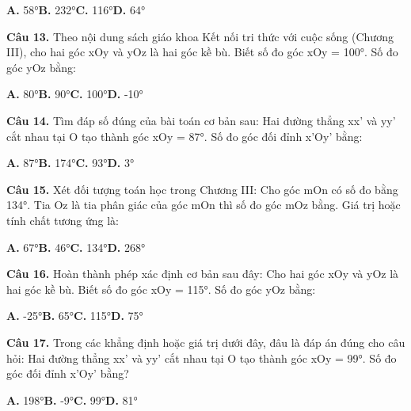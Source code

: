 \documentclass[11pt,a4paper]{article}
\begin{document}
\hspace*{1.5em}\textbf{A.} 58°\quad\quad \textbf{B.} 232°\quad\quad \textbf{C.} 116°\quad\quad \textbf{D.} 64°\par\vspace{2pt}
\textbf{\color{primary} Câu 13.} Theo nội dung sách giáo khoa Kết nối tri thức với cuộc sống (Chương III), cho hai góc xOy và yOz là hai góc kề bù. Biết số đo góc xOy = 100°. Số đo góc yOz bằng:\par
\hspace*{1.5em}\textbf{A.} 80°\quad\quad \textbf{B.} 90°\quad\quad \textbf{C.} 100°\quad\quad \textbf{D.} -10°\par\vspace{2pt}
\textbf{\color{primary} Câu 14.} Tìm đáp số đúng của bài toán cơ bản sau: Hai đường thẳng xx' và yy' cắt nhau tại O tạo thành góc xOy = 87°. Số đo góc đối đỉnh x'Oy' bằng:\par
\hspace*{1.5em}\textbf{A.} 87°\quad\quad \textbf{B.} 174°\quad\quad \textbf{C.} 93°\quad\quad \textbf{D.} 3°\par\vspace{2pt}
\textbf{\color{primary} Câu 15.} Xét đối tượng toán học trong Chương III: Cho góc mOn có số đo bằng 134°. Tia Oz là tia phân giác của góc mOn thì số đo góc mOz bằng. Giá trị hoặc tính chất tương ứng là:\par
\hspace*{1.5em}\textbf{A.} 67°\quad\quad \textbf{B.} 46°\quad\quad \textbf{C.} 134°\quad\quad \textbf{D.} 268°\par\vspace{2pt}
\textbf{\color{primary} Câu 16.} Hoàn thành phép xác định cơ bản sau đây: Cho hai góc xOy và yOz là hai góc kề bù. Biết số đo góc xOy = 115°. Số đo góc yOz bằng:\par
\hspace*{1.5em}\textbf{A.} -25°\quad\quad \textbf{B.} 65°\quad\quad \textbf{C.} 115°\quad\quad \textbf{D.} 75°\par\vspace{2pt}
\textbf{\color{primary} Câu 17.} Trong các khẳng định hoặc giá trị dưới đây, đâu là đáp án đúng cho câu hỏi: Hai đường thẳng xx' và yy' cắt nhau tại O tạo thành góc xOy = 99°. Số đo góc đối đỉnh x'Oy' bằng?\par
\hspace*{1.5em}\textbf{A.} 198°\quad\quad \textbf{B.} -9°\quad\quad \textbf{C.} 99°\quad\quad \textbf{D.} 81°\par\vspace{2pt}
\end{document}

